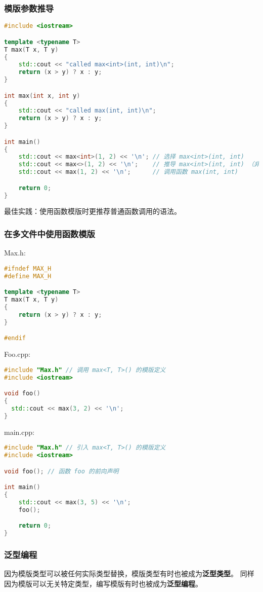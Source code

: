 \documentclass[../../LearnCpp.tex]{subfiles}
\begin{document}
\subsubsection*{模版参数推导}

\begin{lstlisting}[language=C++]
#include <iostream>

template <typename T>
T max(T x, T y)
{
    std::cout << "called max<int>(int, int)\n";
    return (x > y) ? x : y;
}

int max(int x, int y)
{
    std::cout << "called max(int, int)\n";
    return (x > y) ? x : y;
}

int main()
{
    std::cout << max<int>(1, 2) << '\n'; // 选择 max<int>(int, int)
    std::cout << max<>(1, 2) << '\n';    // 推导 max<int>(int, int) （非模版函数不被考虑）
    std::cout << max(1, 2) << '\n';      // 调用函数 max(int, int)

    return 0;
}
\end{lstlisting}

最佳实践：使用函数模版时更推荐普通函数调用的语法。

\subsubsection*{在多文件中使用函数模版}

Max.h:

\begin{lstlisting}[language=C++]
#ifndef MAX_H
#define MAX_H

template <typename T>
T max(T x, T y)
{
    return (x > y) ? x : y;
}

#endif
\end{lstlisting}

Foo.cpp:

\begin{lstlisting}[language=C++]
#include "Max.h" // 调用 max<T, T>() 的模版定义
#include <iostream>

void foo()
{
  std::cout << max(3, 2) << '\n';
}
\end{lstlisting}

main.cpp:

\begin{lstlisting}[language=C++]
#include "Max.h" // 引入 max<T, T>() 的模版定义
#include <iostream>

void foo(); // 函数 foo 的前向声明

int main()
{
    std::cout << max(3, 5) << '\n';
    foo();

    return 0;
}
\end{lstlisting}

\subsubsection*{泛型编程}

因为模版类型可以被任何实际类型替换，模版类型有时也被成为\textbf{泛型类型}。
同样因为模版可以无关特定类型，编写模版有时也被成为\textbf{泛型编程}。
\end{document}
